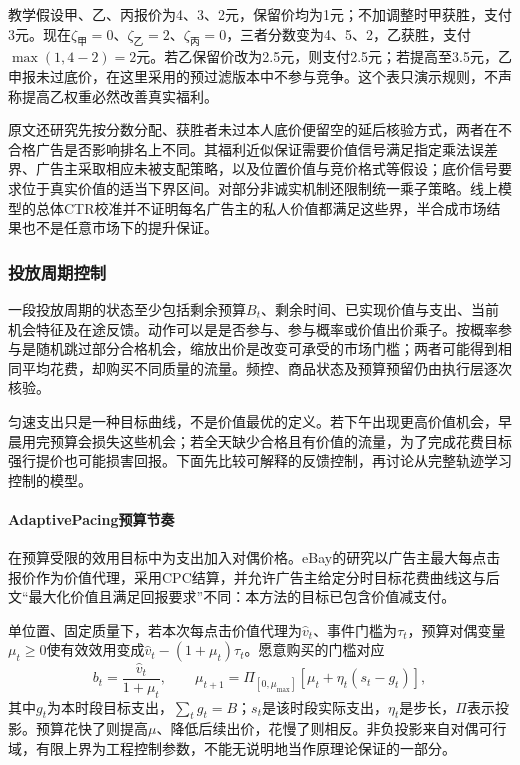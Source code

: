 教学假设甲、乙、丙报价为4、3、2元，保留价均为1元；不加调整时甲获胜，支付3元。现在$\zeta_{\text{甲}}=0$、$\zeta_{\text{乙}}=2$、$\zeta_{\text{丙}}=0$，三者分数变为4、5、2，乙获胜，支付$\max(1,4-2)=2$元。若乙保留价改为2.5元，则支付2.5元；若提高至3.5元，乙申报未过底价，在这里采用的预过滤版本中不参与竞争。这个表只演示规则，不声称提高乙权重必然改善真实福利。

原文还研究先按分数分配、获胜者未过本人底价便留空的延后核验方式，两者在不合格广告是否影响排名上不同。其福利近似保证需要价值信号满足指定乘法误差界、广告主采取相应未被支配策略，以及位置价值与竞价格式等假设；底价信号要求位于真实价值的适当下界区间。对部分非诚实机制还限制统一乘子策略。线上模型的总体CTR校准并不证明每名广告主的私人价值都满足这些界，半合成市场结果也不是任意市场下的提升保证。

\subsubsection{投放周期控制}
\label{sec:rs-advertising-period}

一段投放周期的状态至少包括剩余预算$B_t$、剩余时间、已实现价值与支出、当前机会特征及在途反馈。动作可以是是否参与、参与概率或价值出价乘子。按概率参与是随机跳过部分合格机会，缩放出价是改变可承受的市场门槛；两者可能得到相同平均花费，却购买不同质量的流量。频控、商品状态及预算预留仍由执行层逐次核验。

匀速支出只是一种目标曲线，不是价值最优的定义。若下午出现更高价值机会，早晨用完预算会损失这些机会；若全天缺少合格且有价值的流量，为了完成花费目标强行提价也可能损害回报。下面先比较可解释的反馈控制，再讨论从完整轨迹学习控制的模型。

\paragraph{AdaptivePacing预算节奏}
\label{sec:rs-advertising-adaptive-pacing}

在预算受限的效用目标中为支出加入对偶价格。eBay的研究以广告主最大每点击报价作为价值代理，采用CPC结算，并允许广告主给定分时目标花费曲线这与后文“最大化价值且满足回报要求”不同：本方法的目标已包含价值减支付。

单位置、固定质量下，若本次每点击价值代理为$\widehat v_t$、事件门槛为$\tau_t$，预算对偶变量$\mu_t\geq0$使有效效用变成$\widehat v_t-(1+\mu_t)\tau_t$。愿意购买的门槛对应
\begin{equation}
  b_t=\frac{\widehat v_t}{1+\mu_t},\qquad
  \mu_{t+1}
    =\Pi_{[0,\mu_{\max}]}
       \left[\mu_t+\eta_t(s_t-g_t)\right],
  \label{eq:rs-advertising-adaptive-pacing}
\end{equation}
其中$g_t$为本时段目标支出，$\sum_tg_t=B$；$s_t$是该时段实际支出，$\eta_t$是步长，$\Pi$表示投影。预算花快了则提高$\mu$、降低后续出价，花慢了则相反。非负投影来自对偶可行域，有限上界为工程控制参数，不能无说明地当作原理论保证的一部分。

